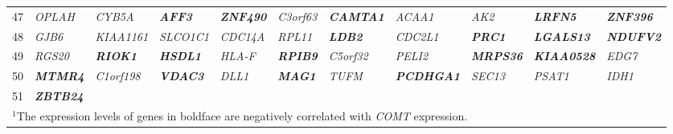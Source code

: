 \documentclass[letterpaper,12pt]{article}
\numberwithin{equation}{appendix}
\begin{document}
\begin{landscape}
{{\begin{longtable}{l >{\itshape}l >{\itshape}l >{\itshape}l >{\itshape}l >{\itshape}l >{\itshape}l >{\itshape}l >{\itshape}l >{\itshape}l >{\itshape}l}
47&OPLAH&CYB5A&{\bfseries {AFF3}}&{\bfseries {ZNF490}}&C3orf63&{\bfseries {CAMTA1}}&ACAA1&AK2&{\bfseries {LRFN5}}&{\bfseries {ZNF396}}\tabularnewline
48&GJB6&KIAA1161&SLCO1C1&CDC14A&RPL11&{\bfseries {LDB2}}&CDC2L1&{\bfseries {PRC1}}&{\bfseries {LGALS13}}&{\bfseries {NDUFV2}}\tabularnewline
49&RGS20&{\bfseries {RIOK1}}&{\bfseries {HSDL1}}&HLA-F&{\bfseries {RPIB9}}&C5orf32&PELI2&{\bfseries {MRPS36}}&{\bfseries {KIAA0528}}&EDG7\tabularnewline
50&{\bfseries {MTMR4}}&C1orf198&{\bfseries {VDAC3}}&DLL1&{\bfseries {MAG1}}&TUFM&{\bfseries {PCDHGA1}}&SEC13&PSAT1&IDH1\tabularnewline
51&{\bfseries {ZBTB24}}&&&&&&&&&\tabularnewline \hline
\multicolumn{11}{l}{$^{1}${\scriptsize {The expression levels of genes in boldface are negatively correlated with {\textit {COMT}} expression.}}}
\end{longtable}
}}


\vspace{2em}

{\scriptsize {

}}
\end{landscape}
\end{document}
